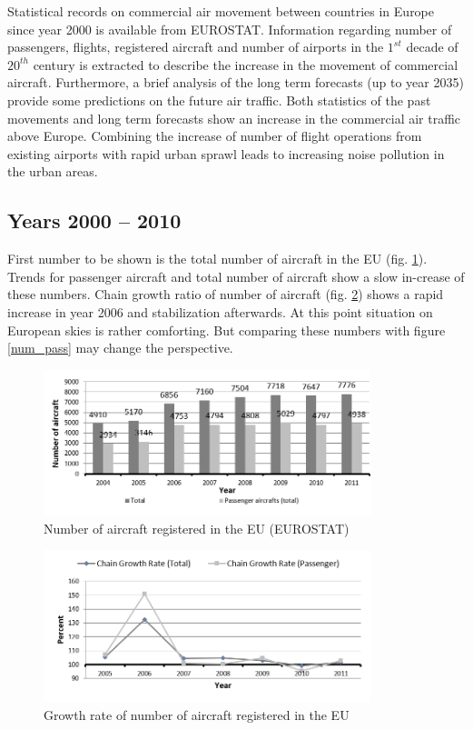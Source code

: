 Statistical records on commercial air movement between countries in Europe since year 2000 is available from EUROSTAT. Information regarding number of passengers, flights, registered aircraft and number of airports in the $1^{st}$ decade of $20^{th}$ century is extracted to describe the increase in the movement of commercial aircraft. Furthermore, a brief analysis of the long term forecasts (up to year 2035) provide some predictions on the future air traffic. Both statistics of the past movements and long term forecasts show an increase in the commercial air traffic above Europe. Combining the increase of number of flight operations from existing airports with rapid urban sprawl leads to increasing noise pollution in the urban areas.

\subsection{Years 2000 -- 2010}

First number to be shown is the total number of aircraft in the EU (fig. \ref{num_aircraft}). Trends for passenger aircraft and total number of aircraft show a slow in-crease of these numbers. Chain growth ratio of number of aircraft (fig. \ref{num_aircraft2}) shows a rapid increase in year 2006 and stabilization afterwards. At this point situation on European skies is rather comforting. But comparing these numbers with figure \ref{num_pass} may change the perspective.

\begin{figure}[h!]
\centering %
\includegraphics[width=0.85\textwidth]{Pictures/num_aircraft.png}
\caption{Number of aircraft registered in the EU (EUROSTAT)}
\label{num_aircraft}
\end{figure}

\begin{figure}[h!]
\centering %
\includegraphics[width=0.85\textwidth]{Pictures/num_aircraft2.png}
\caption{Growth rate of number of aircraft registered in the EU}
\label{num_aircraft2}
\end{figure}

